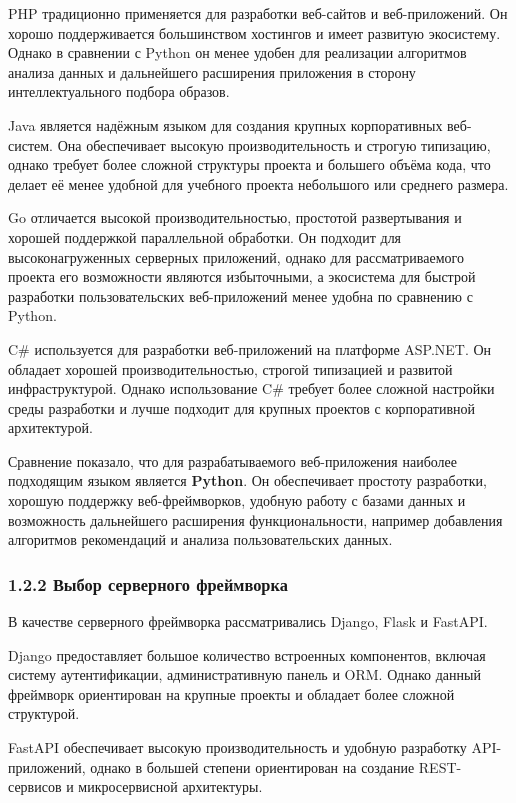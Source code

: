 PHP традиционно применяется для разработки веб-сайтов и веб-приложений. Он хорошо поддерживается большинством хостингов и имеет развитую экосистему. Однако в сравнении с Python он менее удобен для реализации алгоритмов анализа данных и дальнейшего расширения приложения в сторону интеллектуального подбора образов.

Java является надёжным языком для создания крупных корпоративных веб-систем. Она обеспечивает высокую производительность и строгую типизацию, однако требует более сложной структуры проекта и большего объёма кода, что делает её менее удобной для учебного проекта небольшого или среднего размера.

Go отличается высокой производительностью, простотой развертывания и хорошей поддержкой параллельной обработки. Он подходит для высоконагруженных серверных приложений, однако для рассматриваемого проекта его возможности являются избыточными, а экосистема для быстрой разработки пользовательских веб-приложений менее удобна по сравнению с Python.

C\# используется для разработки веб-приложений на платформе ASP.NET. Он обладает хорошей производительностью, строгой типизацией и развитой инфраструктурой. Однако использование C\# требует более сложной настройки среды разработки и лучше подходит для крупных проектов с корпоративной архитектурой.

Сравнение показало, что для разрабатываемого веб-приложения наиболее подходящим языком является \textbf{Python}. Он обеспечивает простоту разработки, хорошую поддержку веб-фреймворков, удобную работу с базами данных и возможность дальнейшего расширения функциональности, например добавления алгоритмов рекомендаций и анализа пользовательских данных.

\subsubsection*{\hspace{1.25cm}1.2.2 Выбор серверного фреймворка}

В качестве серверного фреймворка рассматривались Django, Flask и FastAPI.

Django предоставляет большое количество встроенных компонентов, включая систему аутентификации, административную панель и ORM. Однако данный фреймворк ориентирован на крупные проекты и обладает более сложной структурой.

FastAPI обеспечивает высокую производительность и удобную разработку API-приложений, однако в большей степени ориентирован на создание REST-сервисов и микросервисной архитектуры.

